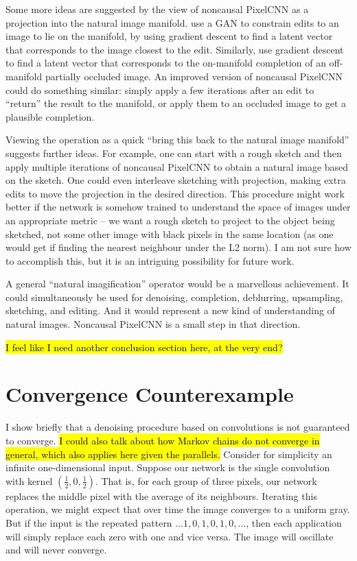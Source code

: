 \documentclass[11pt, a4paper, openany]{book}
\newcommand{\nquote}[1]{``{#1}''}
\begin{document}
Some more ideas are suggested by the view of noncausal PixelCNN as a projection into the natural image manifold. \citet{manifoldmanipulation} use a GAN to constrain edits to an image to lie on the manifold, by using gradient descent to find a latent vector that corresponds to the image closest to the edit. Similarly, \citet{imageinpainting} use gradient descent to find a latent vector that corresponds to the on-manifold completion of an off-manifold partially occluded image. An improved version of noncausal PixelCNN could do something similar: simply apply a few iterations after an edit to \nquote{return} the result to the manifold, or apply them to an occluded image to get a plausible completion.

Viewing the operation as a quick \nquote{bring this back to the natural image manifold} suggests further ideas. For example, one can start with a rough sketch and then apply multiple iterations of noncausal PixelCNN to obtain a natural image based on the sketch. One could even interleave sketching with projection, making extra edits to move the projection in the desired direction. This procedure might work better if the network is somehow trained to understand the space of images under an appropriate metric -- we want a rough sketch to project to the object being sketched, not some other image with black pixels in the same location (as one would get if finding the nearest neighbour under the L2 norm). I am not sure how to accomplish this, but it is an intriguing possibility for future work.

A general \nquote{natural imagification} operator would be a marvellous achievement. It could simultaneously be used for denoising, completion, deblurring, upsampling, sketching, and editing. And it would represent a new kind of understanding of natural images. Noncausal PixelCNN is a small step in that direction.

\hl{I feel like I need another conclusion section here, at the very end?}


\appendix
\chapter{Convergence Counterexample} \label{theoryanalysis}
I show briefly that a denoising procedure based on convolutions is not guaranteed to converge. \hl{I could also talk about how Markov chains do not converge in general, which also applies here given the parallels.} Consider for simplicity an infinite one-dimensional input. Suppose our network is the single convolution with kernel $(\frac{1}{2},0,\frac{1}{2})$. That is, for each group of three pixels, our network replaces the middle pixel with the average of its neighbours. Iterating this operation, we might expect that over time the image converges to a uniform gray. But if the input is the repeated pattern $\dots 1,0,1,0,1,0,\dots$, then each application will simply replace each zero with one and vice versa. The image will oscillate and will never converge.
\end{document}
